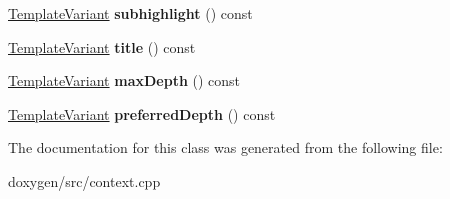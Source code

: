 \begin{DoxyCompactItemize}
\mbox{\hyperlink{class_template_variant}{Template\+Variant}} {\bfseries subhighlight} () const
\item 
\mbox{\label{class_page_tree_context_1_1_private_a2837be512159a187677cae18162af83e}} 
\mbox{\hyperlink{class_template_variant}{Template\+Variant}} {\bfseries title} () const
\item 
\mbox{\label{class_page_tree_context_1_1_private_a7ffe0cc18e89dd77ed2b1d38120baa20}} 
\mbox{\hyperlink{class_template_variant}{Template\+Variant}} {\bfseries max\+Depth} () const
\item 
\mbox{\label{class_page_tree_context_1_1_private_aaeffa8ed52dfda04077381fe04b59f08}} 
\mbox{\hyperlink{class_template_variant}{Template\+Variant}} {\bfseries preferred\+Depth} () const
\end{DoxyCompactItemize}


The documentation for this class was generated from the following file\+:\begin{DoxyCompactItemize}
\item 
doxygen/src/context.\+cpp\end{DoxyCompactItemize}
